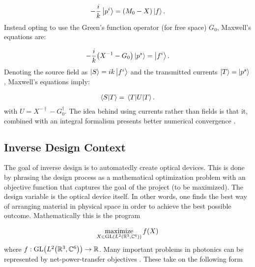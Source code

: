 \documentclass[twocolumn]{revtex4-2}
\DeclareMathOperator*{\maximize}{maximize}
\begin{document}
\begin{align}
-\frac{i}{k}\ket{p^i} = \qty(M_0-X)\ket{f}.
\end{align}
Instead opting to use the Green's function operator (for free space) $G_0$, Maxwell's equations are:

\begin{align}
-\frac{i}{k}\qty(X^{-1}-G_0)\ket{p^s}=\ket{f^i}.
\end{align}
Denoting the source field as $\ket{S} = ik\ket{f^i}$ and the transmitted currents $\ket{T} = \ket{p^s}$, Maxwell's equations imply:

\begin{align}
\braket{S}{T} = \ev{U}{T}.
\label{eq:power_transfer}
\end{align}
with $U=X^{-\dagger}-G_0^\dagger$. The idea behind using currents rather than fields is that it, combined with an integral formalism presents better numerical convergence \cite{markkanen2012discretization}.

\subsection{Inverse Design Context}
\label{sec:context}
The goal of inverse design is to automatedly create optical devices. This is done by phrasing the design process as a mathematical optimization problem with an objective function that captures the goal of the project (to be maximized). The design variable is the optical device itself. In other words, one finds the best way of arranging material in physical space in order to achieve the best possible outcome. Mathematically this is the program

\begin{align}
	\maximize_{X\in\text{GL}\qty(L^2\qty(\mathbb{R}^3, \mathbb{C}^6))} f\qty(X)
\end{align}
where $f:\text{GL}\qty(L^2\qty(\mathbb{R}^3, \mathbb{C}^6))\rightarrow\mathbb{R}$. Many important problems in photonics can be represented by net-power-transfer objectives \cite{molesky2020global}. These take on the following form
\end{document}
